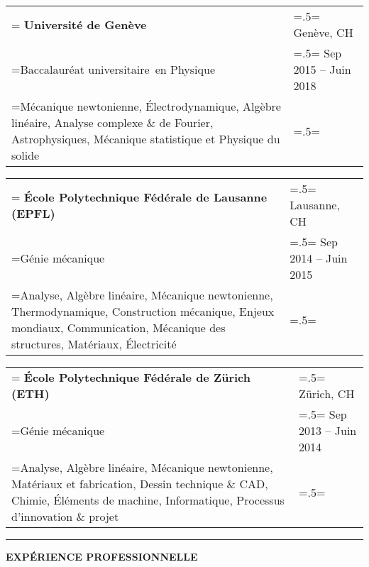 \documentclass[letterpaper, 11pt]{article}
\begin{document}
\begin{tabularx}{1.0\textwidth} { 
   >{\raggedright\arraybackslash\hsize=1.5\hsize\linewidth=\hsize}X 
   >{\raggedleft\arraybackslash\hsize=.5\hsize\linewidth=\hsize}X }
\normalsize
\bf{Université de Genève} & Genève, CH \\
\normalfont Baccalauréat universitaire\ en Physique & Sep 2015 -- Juin 2018  \\  
Mécanique newtonienne, Électrodynamique, Algèbre linéaire, Analyse complexe \& de Fourier, Astrophysiques, Mécanique statistique et Physique du solide &
\end{tabularx}
\vspace{0.25cm}

\begin{tabularx}{1.0\textwidth} { 
   >{\raggedright\arraybackslash\hsize=1.5\hsize\linewidth=\hsize}X 
   >{\raggedleft\arraybackslash\hsize=.5\hsize\linewidth=\hsize}X }
\normalsize
\bf{École Polytechnique Fédérale de Lausanne (EPFL)} & Lausanne, CH \\
\normalfont Génie mécanique & Sep 2014 -- Juin 2015\\
Analyse, Algèbre linéaire, Mécanique newtonienne, Thermodynamique, 
Construction mécanique, Enjeux mondiaux, Communication, Mécanique des structures, Matériaux, Électricité
\end{tabularx}
\vspace{0.25cm}

\begin{tabularx}{1.0\textwidth} { 
   >{\raggedright\arraybackslash\hsize=1.5\hsize\linewidth=\hsize}X 
   >{\raggedleft\arraybackslash\hsize=.5\hsize\linewidth=\hsize}X }
\normalsize
\bf{École Polytechnique Fédérale de Zürich (ETH)} & Zürich, CH \\
\normalfont Génie mécanique & Sep 2013 -- Juin 2014 \\
Analyse, Algèbre linéaire, Mécanique newtonienne, Matériaux et fabrication, Dessin technique \& CAD, Chimie, Éléments de machine, Informatique, Processus d'innovation \& projet
\end{tabularx}
\vspace{0.25cm}

\begin{center}
\noindent\rule{0.75\textwidth}{1pt}
\end{center}

\begin{center}
\large\bf{EXPÉRIENCE PROFESSIONNELLE}
\end{center}
\end{document}
